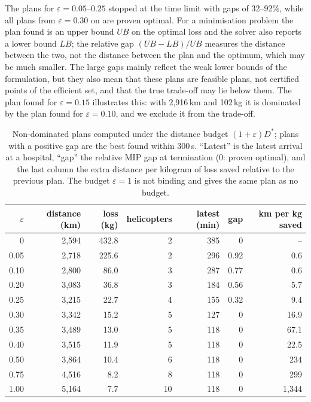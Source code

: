 \documentclass[11pt,a4paper]{article}
\theoremstyle{definition}
\begin{document}
The plans for $\varepsilon=0.05$--$0.25$ stopped at the time limit with gaps of 32--92\%, while all plans from $\varepsilon=0.30$ on are proven optimal.
For a minimisation problem the plan found is an upper bound $UB$ on the optimal loss and the solver also reports a lower bound $LB$; the relative gap $(UB-LB)/UB$ measures the distance between the two, not the distance between the plan and the optimum, which may be much smaller.
The large gaps mainly reflect the weak lower bounds of the formulation, but they also mean that these plans are feasible plans, not certified points of the efficient set, and that the true trade-off may lie below them.
The plan found for $\varepsilon=0.15$ illustrates this: with 2{,}916\,km and 102\,kg it is dominated by the plan found for $\varepsilon=0.10$, and we exclude it from the trade-off.

\begin{table}[ht]
\centering
\caption{Non-dominated plans computed under the distance budget $(1+\varepsilon)D^*$; plans with a positive gap are the best found within 300\,s. ``Latest'' is the latest arrival at a hospital, ``gap'' the relative MIP gap at termination (0: proven optimal), and the last column the extra distance per kilogram of loss saved relative to the previous plan. The budget $\varepsilon=1$ is not binding and gives the same plan as no budget.}\label{tab:q3}
\small
\begin{tabular}{rrrrrrr}
\toprule
$\varepsilon$ & distance (km) & loss (kg) & helicopters & latest (min) & gap & km per kg saved \\
\midrule
0 & 2{,}594 & 432.8 & 2 & 385 & 0 & -- \\
0.05 & 2{,}718 & 225.6 & 2 & 296 & 0.92 & 0.6 \\
0.10 & 2{,}800 & 86.0 & 3 & 287 & 0.77 & 0.6 \\
0.20 & 3{,}083 & 36.8 & 3 & 184 & 0.56 & 5.7 \\
0.25 & 3{,}215 & 22.7 & 4 & 155 & 0.32 & 9.4 \\
0.30 & 3{,}342 & 15.2 & 5 & 127 & 0 & 16.9 \\
0.35 & 3{,}489 & 13.0 & 5 & 118 & 0 & 67.1 \\
0.40 & 3{,}515 & 11.9 & 5 & 118 & 0 & 22.5 \\
0.50 & 3{,}864 & 10.4 & 6 & 118 & 0 & 234 \\
0.75 & 4{,}516 & 8.2 & 8 & 118 & 0 & 299 \\
1.00 & 5{,}164 & 7.7 & 10 & 118 & 0 & 1{,}344 \\
\bottomrule
\end{tabular}
\end{table}
\end{document}

